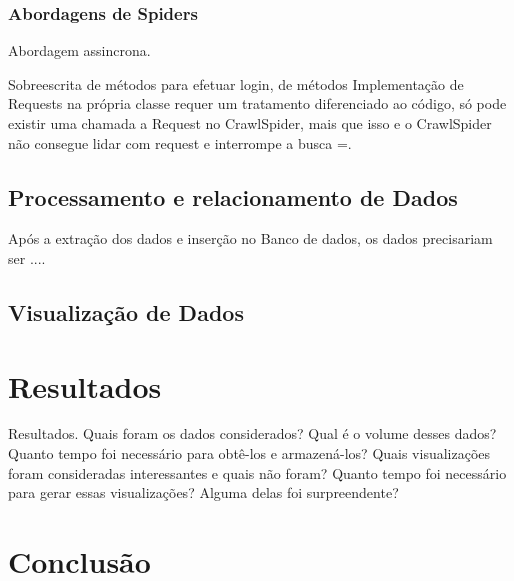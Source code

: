 \documentclass[12pt]{article}
\begin{document}
\subsubsection {Abordagens de Spiders}

Abordagem assincrona.

Sobreescrita de métodos para efetuar login, de métodos
Implementação de Requests na própria classe requer um tratamento diferenciado ao código, só pode existir uma chamada a Request no CrawlSpider, mais que isso e o CrawlSpider não consegue lidar com request e interrompe a busca =.



\subsection{Processamento e relacionamento de Dados}

Após a extração dos dados e inserção no Banco de dados, os dados precisariam ser ....


\subsection{Visualização de Dados}

\section{Resultados}

Resultados.
Quais foram os dados considerados? Qual é o volume desses dados? Quanto tempo foi
necessário para obtê-los e armazená-los? Quais visualizações foram consideradas interessantes e quais não
foram? Quanto tempo foi necessário para gerar essas visualizações? Alguma delas foi surpreendente?


\section{Conclusão}



\begin{thebibliography}{2}

\end{thebibliography}
\end{document}
